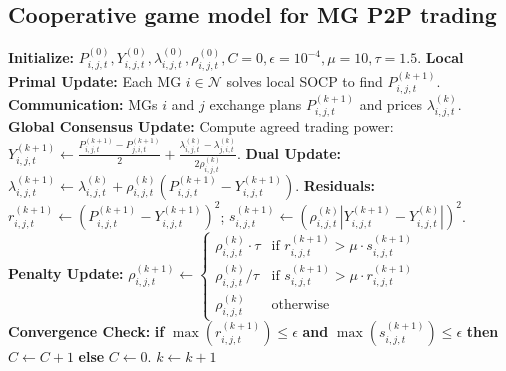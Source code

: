 \documentclass[preprint,12pt]{elsarticle}
\begin{document}
\subsection{Cooperative game model for MG P2P trading}
\vspace{10pt}
\begin{breakablealgorithm}
    \caption{Distributed Consensus ADMM with Dynamic Penalty for P2P Trading}
    \small
    \begin{algorithmic}[2]
        \State \textbf{Initialize:} $P_{i,j,t}^{(0)}, Y_{i,j,t}^{(0)}, \lambda_{i,j,t}^{(0)}, \rho_{i,j,t}^{(0)}, C=0, \epsilon=10^{-4}, \mu=10, \tau=1.5$.
        \Repeat
            \State \textbf{Local Primal Update:} Each MG $i \in \mathcal{N}$ solves local SOCP to find $P_{i,j,t}^{(k+1)}$.
            \State \textbf{Communication:} MGs $i$ and $j$ exchange plans $P_{i,j,t}^{(k+1)}$ and prices $\lambda_{i,j,t}^{(k)}$.
            \State \textbf{Global Consensus Update:} Compute agreed trading power:
            \Statex \qquad $Y_{i,j,t}^{(k+1)} \gets \frac{P_{i,j,t}^{(k+1)} - P_{j,i,t}^{(k+1)}}{2} + \frac{\lambda_{i,j,t}^{(k)} - \lambda_{j,i,t}^{(k)}}{2\rho_{i,j,t}^{(k)}}$.
            \State \textbf{Dual Update:} 
            \Statex \qquad $\lambda_{i,j,t}^{(k+1)} \gets \lambda_{i,j,t}^{(k)} + \rho_{i,j,t}^{(k)} \left(P_{i,j,t}^{(k+1)} - Y_{i,j,t}^{(k+1)}\right)$.
            \State \textbf{Residuals:} 
            \Statex \qquad $r_{i,j,t}^{(k+1)} \gets \left(P_{i,j,t}^{(k+1)} - Y_{i,j,t}^{(k+1)}\right)^2$; \quad $s_{i,j,t}^{(k+1)} \gets \left(\rho_{i,j,t}^{(k)} \left|Y_{i,j,t}^{(k+1)} - Y_{i,j,t}^{(k)}\right|\right)^2$.
            \State \textbf{Penalty Update:} 
            \Statex \qquad $\rho_{i,j,t}^{(k+1)} \gets \begin{cases} \rho_{i,j,t}^{(k)} \cdot \tau & \text{if } r_{i,j,t}^{(k+1)} > \mu \cdot s_{i,j,t}^{(k+1)} \\ \rho_{i,j,t}^{(k)} / \tau & \text{if } s_{i,j,t}^{(k+1)} > \mu \cdot r_{i,j,t}^{(k+1)} \\ \rho_{i,j,t}^{(k)} & \text{otherwise} \end{cases}$
            \State \textbf{Convergence Check:} 
            \Statex \qquad \textbf{if} $\max(r_{i,j,t}^{(k+1)}) \le \epsilon$ \textbf{and} $\max(s_{i,j,t}^{(k+1)}) \le \epsilon$ \textbf{then} $C \gets C + 1$ \textbf{else} $C \gets 0$.
            \State $k \gets k + 1$
    \end{algorithmic}
    \label{ADMM_algorithm}
\end{breakablealgorithm}
\end{document}
